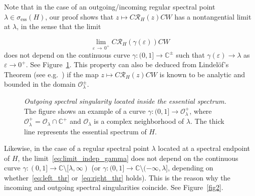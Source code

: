 \documentclass[AHL,Unicode,longabstracts,published]{cedram}
\newcommand{\bbC}{\mathbb{C}}
\newcommand{\ess}{\mathrm{ess}}
\newcommand{\Res}{\mathcal{R}}
\newcommand*\bbC{\mathbb{C}}
\newcommand{\ess}{\mathrm{ess}}
\begin{document}
Note that in the case of an outgoing/incoming regular spectral point $\lambda\in\sigma_{\ess}(H)$, our proof shows that $z\mapsto C\Res_H(z)CW$ has a nontangential limit at $\lambda$, in the sense that the limit

\begin{equation}\label{eq:limit_indep_gamma}
\lim_{\varepsilon\,\to\,0^+}C\Res_H(\gamma(\varepsilon))CW
\end{equation}
does not depend on the continuous curve $\gamma:(0,1]\to\bbC^\pm$ such that $\gamma(\varepsilon)\to\lambda$ as $\varepsilon\to0^+$. See Figure~\ref{fig4}. This property can also be deduced from Lindel\"of's Theorem (see e.g.~\cite{Rud1980}) if the map $z\mapsto C\Res_H(z)CW$ is known to be analytic and bounded in the domain $\mathcal{O}_\lambda^\pm$.

\begin{figure}[H]
\begin{center}
\end{center}
\caption{\emph{Outgoing spectral singularity located inside the essential spectrum.} The figure shows an example of a curve $\gamma:(0,1]\to\mathcal{O}^+_\lambda$, where $\mathcal{O}^+_\lambda=\mathcal{O}_\lambda\cap \bbC^+$ and $\mathcal{O}_\lambda$ is a complex neighborhood of $\lambda$. The thick line represents the essential spectrum of $H$.}\label{fig4}
\end{figure}



Likewise, in the case of a regular spectral point $\lambda$ located at a spectral endpoint of $H$, the limit~\eqref{eq:limit_indep_gamma} does not depend on the continuous curve $\gamma:(0,1]\to\bbC\setminus [\lambda,\infty)$ (or $\gamma:(0,1]\to\bbC\setminus (-\infty,\lambda]$, depending on whether~\eqref{eq:left_thr} or~\eqref{eq:right_thr} holds). This is the reason why the incoming and outgoing spectral singularities coincide. See Figure~\ref{fig2}.
\end{document}
